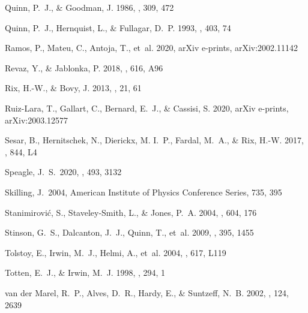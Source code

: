 \documentclass[twocolumn,tighten,twocolappendix]{aastex63}
\begin{document}
\begin{CJK*}{UTF8}{gbsn}
\begin{thebibliography}{}
{Quinn}, P.~J., \& {Goodman}, J. 1986, \apj, 309, 472

{Quinn}, P.~J., {Hernquist}, L., \& {Fullagar}, D.~P. 1993, \apj, 403, 74

{Ramos}, P., {Mateu}, C., {Antoja}, T., {et~al.} 2020, arXiv e-prints,
    arXiv:2002.11142

{Revaz}, Y., \& {Jablonka}, P. 2018, \aap, 616, A96

{Rix}, H.-W., \& {Bovy}, J. 2013, \aapr, 21, 61

{Ruiz-Lara}, T., {Gallart}, C., {Bernard}, E.~J., \& {Cassisi}, S. 2020, arXiv
    e-prints, arXiv:2003.12577

{Sesar}, B., {Hernitschek}, N., {Dierickx}, M. I.~P., {Fardal}, M.~A., \&
    {Rix}, H.-W. 2017, \apjl, 844, L4

 Speagle, J.~S.\ 2020, \mnras, 493, 3132

 Skilling, J.\ 2004,
   American Institute of Physics Conference Series, 735, 395

{Stanimirovi{\'c}}, S., {Staveley-Smith}, L., \& {Jones}, P.~A. 2004, \apj,
    604, 176

  {Stinson}, G.~S., {Dalcanton}, J.~J., {Quinn}, T., {et~al.} 2009, \mnras, 395,
    1455

{Tolstoy}, E., {Irwin}, M.~J., {Helmi}, A., {et~al.} 2004, \apjl, 617, L119

{Totten}, E.~J., \& {Irwin}, M.~J. 1998, \mnras, 294, 1

{van der Marel}, R.~P., {Alves}, D.~R., {Hardy}, E., \& {Suntzeff}, N.~B. 2002,
    \aj, 124, 2639


\end{thebibliography}
\end{CJK*}
\end{document}

